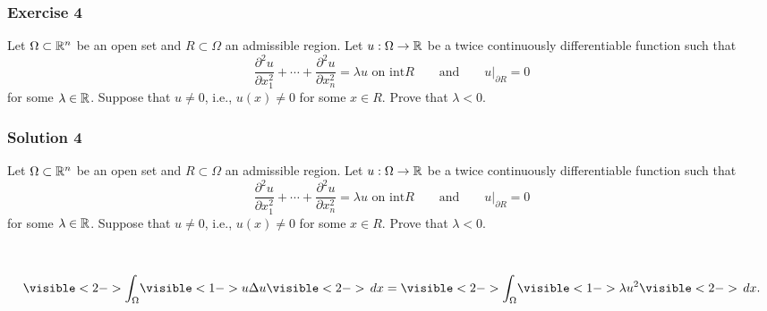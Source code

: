 \documentclass[10pt, t, allowdisplaybreaks]{beamer}
\newcommand{\nullspacesmall}{~\vspace{1em}}
\newcommand{\at}[3]{\left.#1\right\vert_{#2}^{#3}}
\begin{document}
\begin{frame}
    \frametitle{Exercise 4}
    \par Let $\Omega\subset \mathbb{R}^n$ be an open set and $R\subset \Omega$ an admissible region. Let $u:\Omega\rightarrow\mathbb{R}$ be a twice continuously differentiable
    function such that
    \begin{equation*}
        \frac{\partial^2 u}{\partial x^2_1} + \cdots + \frac{\partial^2 u}{\partial x^2_n} = \lambda u\text{ on int}R\qquad \text{and}\qquad \at{u}{\partial R}{} = 0
    \end{equation*}
    for some $\lambda\in\mathbb{R}$. Suppose that $u\neq 0$, i.e., $u(x)\neq 0$ for some $x\in R$. Prove that $\lambda<0$.
\end{frame}

\begin{frame}
    \frametitle{Solution 4}
    \par Let $\Omega\subset \mathbb{R}^n$ be an open set and $R\subset \Omega$ an admissible region. Let $u:\Omega\rightarrow\mathbb{R}$ be a twice continuously differentiable
    function such that
    \begin{equation*}
        \frac{\partial^2 u}{\partial x^2_1} + \cdots + \frac{\partial^2 u}{\partial x^2_n} = \lambda u\text{ on int}R\qquad \text{and}\qquad \at{u}{\partial R}{} = 0
    \end{equation*}
    for some $\lambda\in\mathbb{R}$. Suppose that $u\neq 0$, i.e., $u(x)\neq 0$ for some $x\in R$. Prove that $\lambda<0$.

    \nullspacesmall

    \begin{equation*}
        \visible<2->{\int_\Omega} \visible<1->{u\Delta u}\visible<2->{\,dx} = \visible<2->{\int_\Omega} \visible<1->{\lambda u^2}\visible<2->{\,dx}.
    \end{equation*}

\end{frame}
\end{document}
